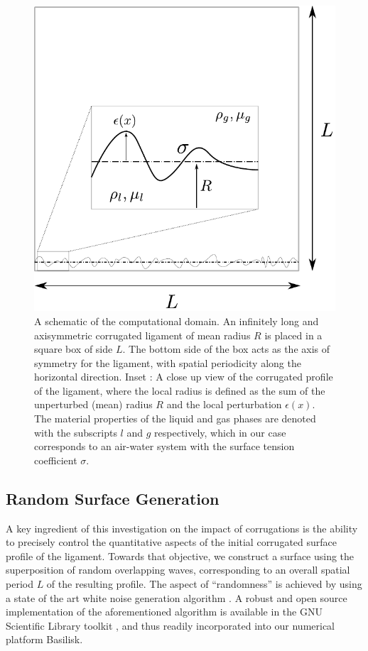 \begin{figure}
\centering
\includegraphics{plots/ligament_breakup/schematic.pdf}
\caption{ A schematic of the computational domain.
An infinitely long and axisymmetric corrugated ligament
of mean radius $R$ is placed in a square box of side $L$.
The bottom side of the box acts as the axis of symmetry 
for the ligament, with spatial periodicity along the horizontal 
direction. Inset : A close up view of the corrugated profile
of the ligament, where the local radius is defined as 
the sum of the unperturbed (mean) radius $R$ and the local 
perturbation $\epsilon(x)$. The material properties of the 
liquid and gas phases are denoted with the subscripts $l$ and $g$
respectively, which in our case corresponds to an air-water system
with the surface tension coefficient $\sigma$. 
}
\label{schematic}
\end{figure}

\subsection*{Random Surface Generation}

A key ingredient of this investigation on the impact 
of corrugations is the ability to precisely
control the quantitative aspects of the initial 
corrugated surface profile of the ligament. 
Towards that objective, we construct a surface 
using the superposition of random overlapping waves, 
corresponding to an overall spatial period $L$ of the resulting profile. 
The aspect of ``randomness'' is achieved by using a state of the art 
white noise generation algorithm .
A robust and open source implementation of the aforementioned algorithm 
is available in the GNU Scientific Library toolkit \cite{gnusl},
and thus readily incorporated into our numerical platform Basilisk.   

